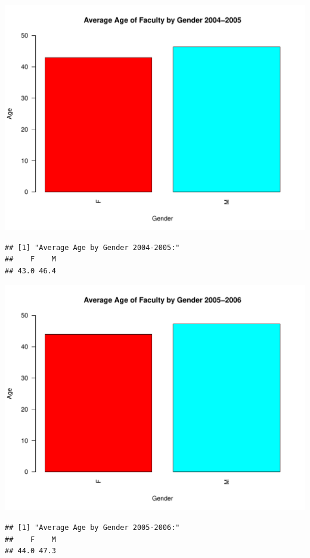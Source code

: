 \documentclass[12pt,a4paper]{article}\usepackage[]{graphicx}\usepackage[]{color}
\makeatletter
\def\maxwidth{ %
  \ifdim\Gin@nat@width>\linewidth
    \linewidth
  \else
    \Gin@nat@width
  \fi
}
\newenvironment{kframe}{%
 \def\at@end@of@kframe{}%
 \ifinner\ifhmode%
  \def\at@end@of@kframe{\end{minipage}}%
  \begin{minipage}{\columnwidth}%
 \fi\fi%
 \def\FrameCommand##1{\hskip\@totalleftmargin \hskip-\fboxsep
 \colorbox{shadecolor}{##1}\hskip-\fboxsep
     \hskip-\linewidth \hskip-\@totalleftmargin \hskip\columnwidth}%
 \MakeFramed {\advance\hsize-\width
   \@totalleftmargin\z@ \linewidth\hsize
   \@setminipage}}%
 {\par\unskip\endMakeFramed%
 \at@end@of@kframe}
\newenvironment{knitrout}{}{} %
\theoremstyle{definition}
\makeatother
\begin{document}
\begin{knitrout}
\color{fgcolor}
\includegraphics[width=\maxwidth]{figure/unnamed-chunk-11-1} 
\begin{kframe}\begin{verbatim}
## [1] "Average Age by Gender 2004-2005:"
##    F    M 
## 43.0 46.4
\end{verbatim}
\end{kframe}
\includegraphics[width=\maxwidth]{figure/unnamed-chunk-11-2} 
\begin{kframe}\begin{verbatim}
## [1] "Average Age by Gender 2005-2006:"
##    F    M 
## 44.0 47.3
\end{verbatim}

\end{kframe}
\end{knitrout}
\end{document}
